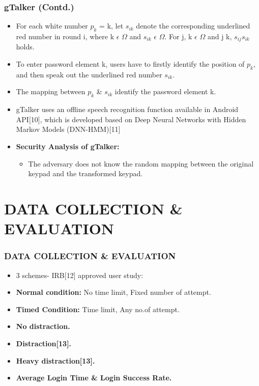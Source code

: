 \documentclass{beamer}
\begin{document}
\begin{frame}
\frametitle{gTalker (Contd.)}

\begin{itemize}
\justifying
    
    \item For each white number $p_k$ = k, let $s_{ik}$
denote the corresponding underlined red number in round i,
where k $\epsilon$ $\Omega$  and $s_{ik}$ $\epsilon$ $\Omega$. For 	\forall j, k $\epsilon$ $\Omega$  and j \neq k, \hspace{2}   $s_{ij}$\neq$s_{ik}$ 
holds.
    
    \item  To enter password element k, users have to
firstly identify the position of  $p_k$, and then
speak out the underlined red number $s_{ik}$.
    
    \item The mapping between $p_k$ \& $s_{ik}$ identify the password element k.
    \item gTalker uses an offline speech
recognition function available in Android API[10], which is
developed based on Deep Neural Networks with Hidden Markov
Models (DNN-HMM)[11]
\item \textbf{Security Analysis of gTalker:}
\begin{itemize}
    \item The adversary does not know the random mapping
between the original keypad and the transformed keypad.
\end{itemize}

\end{itemize}


\end{frame}

\section{DATA COLLECTION \& EVALUATION}
\begin{frame}
\frametitle{DATA COLLECTION \& EVALUATION}

\begin{itemize}
\justifying
    
    \item 3 schemes- IRB[12] approved user study:
    
    \item  \textbf{Normal condition:}  No time limit, Fixed number of attempt.
    \item \textbf{Timed Condition:} Time limit, Any no.of attempt.
    \item \textbf{No distraction.}
    \item \textbf{Distraction[13].}
    \item \textbf{Heavy distraction[13].}
    \item \textbf{Average Login Time \& Login Success Rate.}
\end{itemize}


\end{frame}
\end{document}
